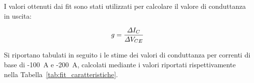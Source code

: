\documentclass[../main.tex]{subfiles}
\begin{document}


    I valori ottenuti dai fit sono stati utilizzati per calcolare il valore
    di conduttanza in uscita:

    \begin{equation*}
        \centering
        g = \frac{\varDelta I_C}{\varDelta V_{CE}}
    \end{equation*}

    Si riportano tabulati in seguito i le stime dei valori di conduttanza
    per correnti di base di -100\;\textmu~A e -200\;\textmu~A, calcolati mediante
    i valori riportati rispettivamente nella Tabella~\ref{tab:fit_caratteristiche}.
\end{document}
